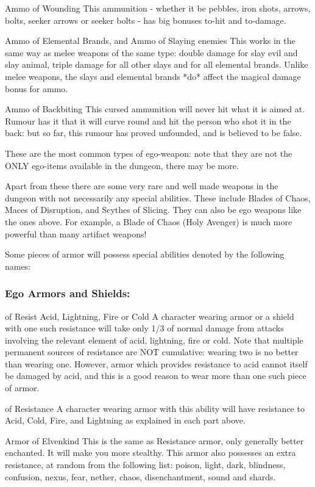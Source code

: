 Ammo of Wounding
    This ammunition - whether it be pebbles, iron shots, arrows, bolts,
    seeker arrows or seeker bolts - has big bonuses to-hit and to-damage.

Ammo of Elemental Brands, and Ammo of Slaying enemies
    This works in the same way as melee weapons of the same type: double
    damage for slay evil and slay animal, triple damage for all other
    slays and for all elemental brands. Unlike melee weapons, the slays
    and elemental brands *do* affect the magical damage bonus for ammo.

Ammo of Backbiting
    This cursed ammunition will never hit what it is aimed at. Rumour has
    it that it will curve round and hit the person who shot it in the
    back: but so far, this rumour has proved unfounded, and is believed
    to be false.

These are the most common types of ego-weapon: note that they are not the
ONLY ego-items available in the dungeon, there may be more.

Apart from these there are some very rare and well made weapons in the
dungeon with not necessarily any special abilities. These include Blades
of Chaos, Maces of Disruption, and Scythes of Slicing. They can also be
ego weapons like the ones above. For example, a Blade of Chaos (Holy
Avenger) is much more powerful than many artifact weapons!

Some pieces of armor will possess special abilities denoted by the following
names:

\subsubsection{Ego Armors and Shields:}
of Resist Acid, Lightning, Fire or Cold
     A character wearing armor or a shield with one such resistance will
     take only 1/3 of normal damage from attacks involving the relevant
     element of acid, lightning, fire or cold. Note that multiple
     permanent sources of resistance are NOT cumulative: wearing two is
     no better than wearing one. However, armor which provides resistance
     to acid cannot itself be damaged by acid, and this is a good reason
     to wear more than one such piece of armor.
 
of Resistance
     A character wearing armor with this ability will have resistance to
     Acid, Cold, Fire, and Lightning as explained in each part above.

Armor of Elvenkind
     This is the same as Resistance armor, only generally better enchanted.
     It will make you more stealthy. This armor also possesses an extra
     resistance, at random from the following list: poison, light, dark,
     blindness, confusion, nexus, fear, nether, chaos, disenchantment,
     sound and shards.
 
